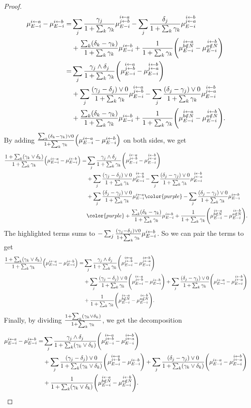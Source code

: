 \begin{proof}
    \newcommand{\zz}{1+\sum_k\gamma_k}
    \begin{align*}
           \ma - \mb
          =&\sj\frac{\gamma_j}{\zz}\mab - \sj\frac{\delta_j}{\zz}\mba
        \\&+\frac{\sum_k(\delta_k-\gamma_k)}{ 1 + \sum_k\gamma_k}\mb
           +\frac{1}{ 1 + \sum_k\gamma_k}\Bigg(\man-\mbn\Bigg)
        \\=&\sj\frac{\gamma_j\wedge\delta_j}{\zz}\Bigg(\mab - \mba\Bigg)
        \\&+\sum_j\frac{(\gamma_j-\delta_j)\vee 0}{\zz}\mab
           -\sum_j\frac{(\delta_j-\gamma_j)\vee 0}{\zz}\mba
        \\&+\frac{\sum_k(\delta_k-\gamma_k)}{\zz}\mb
           +\frac{1}{\zz}\Bigg(\man-\mbn\Bigg).
    \end{align*}
    By adding $\frac{\sum_k (\delta_k-\gamma_k)\vee 0}{\zz}\Big(\ma-\mb\Big)$ on both sides, we get
    \begin{align*}
           \frac{1+\sum_k(\gamma_k\vee\delta_k)}{\zz}\Big(\ma - \mb\Big)
          =&\sj\frac{\gamma_j\wedge\delta_j}{\zz}\Bigg(\mab - \mba\Bigg)
        \\&+\sum_j\frac{(\gamma_j-\delta_j)\vee 0}{\zz}\mab
           -\sum_j\frac{(\delta_j-\gamma_j)\vee 0}{\zz}\mba
        \\&+\sj\frac{(\delta_j-\gamma_j)\vee 0}{\zz}\ma
           {\color{purple}-\sj\frac{(\delta_j-\gamma_j)\vee 0}{\zz}\mb}
        \\&{\color{purple}+\frac{\sum_k(\delta_k-\gamma_k)}{\zz}\mb}
           +\frac{1}{\zz}\Bigg(\man-\mbn\Bigg).
    \end{align*}
    The highlighted terms sums to $-\sj\frac{(\gamma_j-\delta_j)\vee 0}{\zz}\mb$.
    So we can pair the terms to get
    \begin{align*}
           \frac{1+\sum_k(\gamma_k\vee\delta_k)}{\zz}\Big(\ma - \mb\Big)
          =&\sj\frac{\gamma_j\wedge\delta_j}{\zz}\Bigg(\mab - \mba\Bigg)
        \\&+\sum_j\frac{(\gamma_j-\delta_j)\vee 0}{\zz}\Bigg(\mab-\mb\Bigg)
           +\sum_j\frac{(\delta_j-\gamma_j)\vee 0}{\zz}\Bigg(\ma-\mba\Bigg)
        \\&+\frac{1}{\zz}\Bigg(\man-\mbn\Bigg).
    \end{align*}
    Finally, by dividing $\frac{\zzz}{\zz}$, 
    we get the decomposition
    \begin{align*}
        \mu_{E-i}^{i\leftarrow a}-\mu_{E-i}^{i\leftarrow b}
          =&\sum_{j}\frac{\gamma_j\wedge\delta_j}{1+\sum_k(\gamma_k\vee\delta_k)}\Bigg(\mu_{E-i}^{\substack{i\leftarrow a\\j\leftarrow b}} - \mu_{E-i}^{\substack{i\leftarrow b\\j\leftarrow a}}\Bigg)
        \\&+\sum_j\frac{(\gamma_j-\delta_j)\vee 0}{1+\sum_k(\gamma_k\vee\delta_k)}\Bigg(\mu_{E-i}^{\substack{i\leftarrow a\\j\leftarrow b}}-\mu_{E-i}^{i\leftarrow b}\Bigg)
           +\sum_j\frac{(\delta_j-\gamma_j)\vee 0}{1+\sum_k(\gamma_k\vee\delta_k)}\Bigg(\mu_{E-i}^{i\leftarrow a}-\mu_{E-i}^{\substack{i\leftarrow b\\j\leftarrow a}}\Bigg)
        \\&+\frac{1}{1+\sum_k(\gamma_k\vee\delta_k)}\Bigg(\mu_{E-i}^{\substack{i\leftarrow a\\b\notin N}}-\mu_{E-i}^{\substack{i\leftarrow b\\a\notin N}}\Bigg).
    \end{align*}
  
\end{proof}

